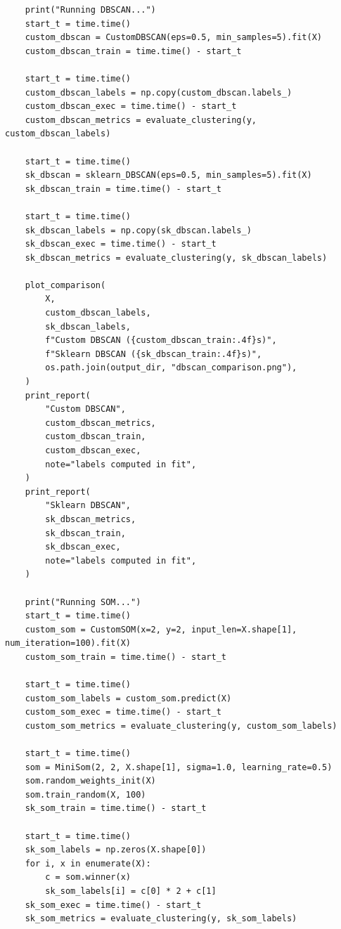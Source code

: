 \documentclass[runningheads]{ctexart}
\begin{document}
\begin{lstlisting}
    print("Running DBSCAN...")
    start_t = time.time()
    custom_dbscan = CustomDBSCAN(eps=0.5, min_samples=5).fit(X)
    custom_dbscan_train = time.time() - start_t

    start_t = time.time()
    custom_dbscan_labels = np.copy(custom_dbscan.labels_)
    custom_dbscan_exec = time.time() - start_t
    custom_dbscan_metrics = evaluate_clustering(y, custom_dbscan_labels)

    start_t = time.time()
    sk_dbscan = sklearn_DBSCAN(eps=0.5, min_samples=5).fit(X)
    sk_dbscan_train = time.time() - start_t

    start_t = time.time()
    sk_dbscan_labels = np.copy(sk_dbscan.labels_)
    sk_dbscan_exec = time.time() - start_t
    sk_dbscan_metrics = evaluate_clustering(y, sk_dbscan_labels)

    plot_comparison(
        X,
        custom_dbscan_labels,
        sk_dbscan_labels,
        f"Custom DBSCAN ({custom_dbscan_train:.4f}s)",
        f"Sklearn DBSCAN ({sk_dbscan_train:.4f}s)",
        os.path.join(output_dir, "dbscan_comparison.png"),
    )
    print_report(
        "Custom DBSCAN",
        custom_dbscan_metrics,
        custom_dbscan_train,
        custom_dbscan_exec,
        note="labels computed in fit",
    )
    print_report(
        "Sklearn DBSCAN",
        sk_dbscan_metrics,
        sk_dbscan_train,
        sk_dbscan_exec,
        note="labels computed in fit",
    )

    print("Running SOM...")
    start_t = time.time()
    custom_som = CustomSOM(x=2, y=2, input_len=X.shape[1], num_iteration=100).fit(X)
    custom_som_train = time.time() - start_t

    start_t = time.time()
    custom_som_labels = custom_som.predict(X)
    custom_som_exec = time.time() - start_t
    custom_som_metrics = evaluate_clustering(y, custom_som_labels)

    start_t = time.time()
    som = MiniSom(2, 2, X.shape[1], sigma=1.0, learning_rate=0.5)
    som.random_weights_init(X)
    som.train_random(X, 100)
    sk_som_train = time.time() - start_t

    start_t = time.time()
    sk_som_labels = np.zeros(X.shape[0])
    for i, x in enumerate(X):
        c = som.winner(x)
        sk_som_labels[i] = c[0] * 2 + c[1]
    sk_som_exec = time.time() - start_t
    sk_som_metrics = evaluate_clustering(y, sk_som_labels)


\end{lstlisting}
\end{document}
